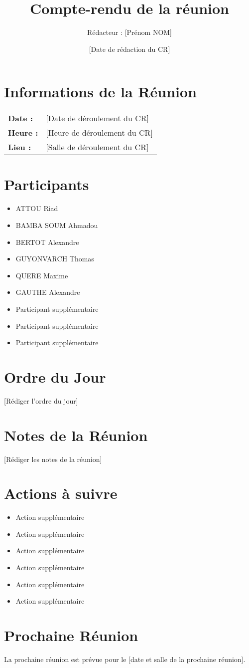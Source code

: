 \documentclass{article}
\title{Compte-rendu de la réunion}
\author{Rédacteur : [Prénom NOM]}
\date{[Date de rédaction du CR]}
\begin{document}
\maketitle

\section*{Informations de la Réunion}
\begin{tabular}{ll}
    \textbf{Date :} & [Date de déroulement du CR] \\
    \textbf{Heure :} & [Heure de déroulement du CR] \\
    \textbf{Lieu :} & [Salle de déroulement du CR] \\
\end{tabular}

\section*{Participants}
\begin{itemize}
    \item ATTOU Riad
    \item BAMBA SOUM Ahmadou
    \item BERTOT Alexandre
    \item GUYONVARCH Thomas
    \item QUERE Maxime
    \item GAUTHE Alexandre
    \item Participant supplémentaire
    \item Participant supplémentaire
    \item Participant supplémentaire
\end{itemize}

\section*{Ordre du Jour}
[Rédiger l'ordre du jour]

\section*{Notes de la Réunion}
[Rédiger les notes de la réunion]

\section*{Actions à suivre}

\begin{itemize}
    \item Action supplémentaire
    \item Action supplémentaire
    \item Action supplémentaire
    \item Action supplémentaire
    \item Action supplémentaire
    \item Action supplémentaire
\end{itemize}

\section*{Prochaine Réunion}
La prochaine réunion est prévue pour le [date et salle de la prochaine réunion].
\end{document}
